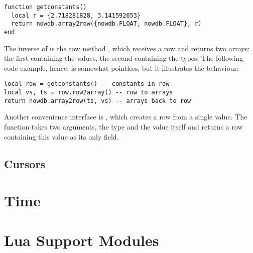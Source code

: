 \begin{lua}
\begin{lstlisting}
function getconstants()
  local r = {2.718281828, 3.141592653}
  return nowdb.array2row({nowdb.FLOAT, nowdb.FLOAT}, r)
end
\end{lstlisting}
\end{lua}

The inverse of  is the row method
, which receives a row and returns
two arrays: the first containing the values,
the second containing the types.
The following code example, hence, is
somewhat pointless, but it illustrates the
behaviour:

\begin{lua}
\begin{lstlisting}
local row = getconstants() -- constants in row
local vs, ts = row.row2array() -- row to arrays
return nowdb.array2row(ts, vs) -- arrays back to row
\end{lstlisting}
\end{lua}

Another convenience interface is ,
which creates a row from a single value. The function
takes two arguments, the type and the value itself
and returns a row containing this value as its
only field.

\subsection{Cursors}

\section{Time}

\section{Lua Support Modules}
